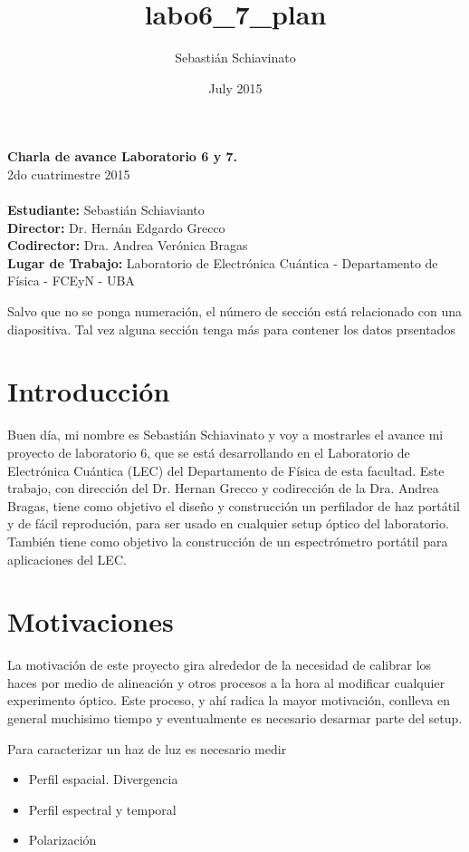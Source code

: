 \documentclass{article}
\title{labo6_7_plan}
\author{Sebastián Schiavinato}
\date{July 2015}
\begin{document}
{\noindent \huge \textbf{Charla de avance Laboratorio 6 y 7.}}\\
{\Large 2do cuatrimestre 2015}\\
\\
\noindent \textbf{Estudiante:} Sebastián Schiavianto\\
\textbf{Director:} Dr. Hernán Edgardo Grecco\\
\textbf{Codirector:} Dra. Andrea Verónica Bragas\\
\textbf{Lugar de Trabajo:} Laboratorio de Electrónica Cuántica - Departamento de Física - FCEyN - UBA

Salvo que no se ponga numeración, el número de sección está relacionado con una diapositiva. Tal vez alguna sección tenga más para contener los datos prsentados

\section{Introducción}

Buen día, mi nombre es Sebastián Schiavinato y voy a mostrarles el avance mi proyecto de laboratorio 6, que se está desarrollando en el Laboratorio de Electrónica Cuántica (LEC) del Departamento de Física de esta facultad. Este trabajo, con dirección del Dr. Hernan Grecco y codirección de la Dra. Andrea Bragas, tiene como objetivo el diseño y construcción un perfilador de haz portátil y de fácil reprodución, para ser usado en cualquier setup óptico del laboratorio. También tiene como objetivo la construcción de un espectrómetro portátil para aplicaciones del LEC.


\section{Motivaciones}
La motivación de este proyecto gira alrededor de la necesidad de calibrar los haces por medio de alineación y otros procesos a la hora al modificar cualquier experimento óptico. Este proceso, y ahí radica la mayor motivación, conlleva en general muchisimo tiempo y eventualmente es necesario desarmar parte del setup.


Para caracterizar un haz de luz es necesario medir
\begin{itemize}
\item Perfil espacial. Divergencia
\item Perfil espectral y temporal
\item Polarización
\end{itemize}
\end{document}
